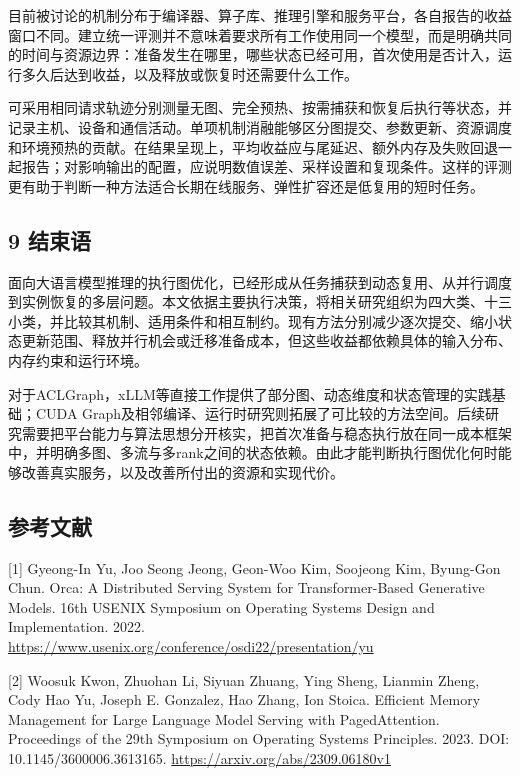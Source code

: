\documentclass[UTF8,11pt,fontset=windows]{ctexart}
\begin{document}
目前被讨论的机制分布于编译器、算子库、推理引擎和服务平台，各自报告的收益窗口不同。建立统一评测并不意味着要求所有工作使用同一个模型，而是明确共同的时间与资源边界：准备发生在哪里，哪些状态已经可用，首次使用是否计入，运行多久后达到收益，以及释放或恢复时还需要什么工作。

可采用相同请求轨迹分别测量无图、完全预热、按需捕获和恢复后执行等状态，并记录主机、设备和通信活动。单项机制消融能够区分图提交、参数更新、资源调度和环境预热的贡献。在结果呈现上，平均收益应与尾延迟、额外内存及失败回退一起报告；对影响输出的配置，应说明数值误差、采样设置和复现条件。这样的评测更有助于判断一种方法适合长期在线服务、弹性扩容还是低复用的短时任务。

\hypertarget{section-9}{%
\subsection{\texorpdfstring{\textbf{9 结束语}}{9 结束语}}\label{section-9}}

面向大语言模型推理的执行图优化，已经形成从任务捕获到动态复用、从并行调度到实例恢复的多层问题。本文依据主要执行决策，将相关研究组织为四大类、十三小类，并比较其机制、适用条件和相互制约。现有方法分别减少逐次提交、缩小状态更新范围、释放并行机会或迁移准备成本，但这些收益都依赖具体的输入分布、内存约束和运行环境。

对于ACLGraph，xLLM等直接工作提供了部分图、动态维度和状态管理的实践基础；CUDA Graph及相邻编译、运行时研究则拓展了可比较的方法空间。后续研究需要把平台能力与算法思想分开核实，把首次准备与稳态执行放在同一成本框架中，并明确多图、多流与多rank之间的状态依赖。由此才能判断执行图优化何时能够改善真实服务，以及改善所付出的资源和实现代价。

\hypertarget{references}{%
\subsection{\texorpdfstring{\textbf{参考文献}}{参考文献}}\label{references}}

\leavevmode{}%
{[}1{]} Gyeong-In Yu, Joo Seong Jeong, Geon-Woo Kim, Soojeong Kim, Byung-Gon Chun. Orca: A Distributed Serving System for Transformer-Based Generative Models. 16th USENIX Symposium on Operating Systems Design and Implementation. 2022. \url{https://www.usenix.org/conference/osdi22/presentation/yu}

\leavevmode{}%
{[}2{]} Woosuk Kwon, Zhuohan Li, Siyuan Zhuang, Ying Sheng, Lianmin Zheng, Cody Hao Yu, Joseph E. Gonzalez, Hao Zhang, Ion Stoica. Efficient Memory Management for Large Language Model Serving with PagedAttention. Proceedings of the 29th Symposium on Operating Systems Principles. 2023. DOI: 10.1145/3600006.3613165. \url{https://arxiv.org/abs/2309.06180v1}
\end{document}

